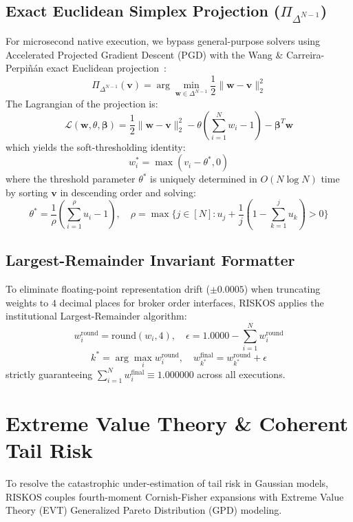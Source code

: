 \documentclass[10pt,journal,compsoc]{IEEEtran}
\begin{document}
\subsection{Exact Euclidean Simplex Projection ($\Pi_{\Delta^{N-1}}$)}
For microsecond native execution, we bypass general-purpose solvers using Accelerated Projected Gradient Descent (PGD) with the Wang \& Carreira-Perpiñán exact Euclidean projection~\cite{wang2013projection}:
\begin{equation}
\Pi_{\Delta^{N-1}}(\mathbf{v}) = \arg\min_{\mathbf{w} \in \Delta^{N-1}} \frac{1}{2} \|\mathbf{w} - \mathbf{v}\|_2^2
\end{equation}
The Lagrangian of the projection is:
\begin{equation}
\mathcal{L}(\mathbf{w}, \theta, \mathbf{\beta}) = \frac{1}{2} \|\mathbf{w} - \mathbf{v}\|_2^2 - \theta \left( \sum_{i=1}^N w_i - 1 \right) - \mathbf{\beta}^T \mathbf{w}
\end{equation}
which yields the soft-thresholding identity:
\begin{equation}
w_i^* = \max(v_i - \theta^*, 0)
\end{equation}
where the threshold parameter $\theta^*$ is uniquely determined in $O(N \log N)$ time by sorting $\mathbf{v}$ in descending order and solving:
\begin{equation}
\theta^* = \frac{1}{\rho} \left( \sum_{i=1}^\rho u_i - 1 \right), \quad \rho = \max \{ j \in [N] : u_j + \frac{1}{j}(1 - \sum_{k=1}^j u_k) > 0 \}
\end{equation}

\subsection{Largest-Remainder Invariant Formatter}
To eliminate floating-point representation drift ($\pm 0.0005$) when truncating weights to $4$ decimal places for broker order interfaces, RISKOS applies the institutional Largest-Remainder algorithm:
\begin{equation}
w_i^{\text{round}} = \text{round}(w_i, 4), \quad \epsilon = 1.0000 - \sum_{i=1}^N w_i^{\text{round}}
\end{equation}
\begin{equation}
k^* = \arg\max_{i} w_i^{\text{round}}, \quad w_{k^*}^{\text{final}} = w_{k^*}^{\text{round}} + \epsilon
\end{equation}
strictly guaranteeing $\sum_{i=1}^N w_i^{\text{final}} \equiv 1.000000$ across all executions.

\section{Extreme Value Theory \& Coherent Tail Risk}
\label{sec:tail_risk}
To resolve the catastrophic under-estimation of tail risk in Gaussian models, RISKOS couples fourth-moment Cornish-Fisher expansions with Extreme Value Theory (EVT) Generalized Pareto Distribution (GPD) modeling.
\end{document}
